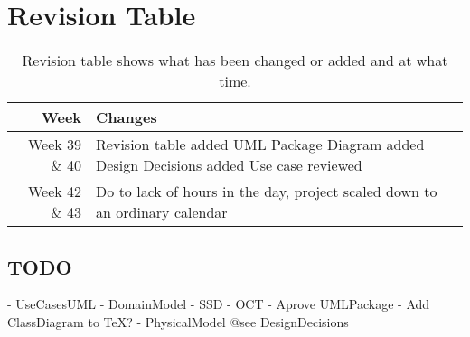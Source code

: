 \section{Revision Table}
\begin{table*}[ht]\centering
  \begin{tabularx}{\textwidth}{@{}rX@{}}
    \toprule
    \textbf{Week} & \textbf{Changes} \\\hline
    Week 39 \& 40 & Revision table added\newline  
		    		UML Package Diagram added\newline
		    		Design Decisions added\newline
		    		Use case reviewed\\\hline
	Week 42 \& 43 & Do to lack of hours in the day, project scaled down to an ordinary calendar \\
    \bottomrule
  \end{tabularx}
  \caption{Revision table shows what has been changed or added and at what time.}
  \label{glossary}\centering
\end{table*}

\subsection{TODO}
- UseCasesUML \newline
- DomainModel \newline
- SSD \newline
- OCT \newline
- Aprove UMLPackage \newline
- Add ClassDiagram to TeX? \newline
- PhysicalModel @see DesignDecisions \newline

\newpage